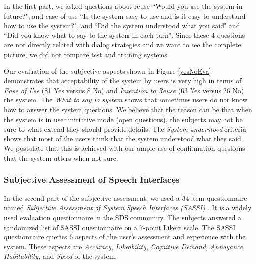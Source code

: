 \begin{sloppy}
In the first part, we asked questions about reuse ``Would you use the system in future?", and ease of use ``Is the system easy to use and is it easy to understand how to use the system?", and ``Did the system understood what you said" and ``Did you know what to say to the system in each turn". Since these 4 questions are not directly related with dialog strategies and we want to see the complete picture, we did not compare test and training systems. 

Our evaluation of the subjective aspects shown in Figure \ref{yesNoEva} demonstrates that acceptability of the system by users is very high in terms of {\em Ease of Use} (81 Yes versus 8 No) and {\em Intention to Reuse} (63 Yes versus 26 No)
the system. The {\em What to say to system} shows that sometimes users do not know how to answer the system questions. We believe that the reason can be that when the system is in user initiative mode (open questions), the subjects may not be sure to what extend they should provide details. 
The {\em System understood} criteria shows that most of the users think that the system understood what they said.  We postulate that this is achieved with our ample use of confirmation questions that the system utters when not sure.

\subsubsection{Subjective Assessment of Speech Interfaces}

In the second part of the subjective assessment, we used a 34-item questionnaire named {\em Subjective Assessment of System Speech Interfaces (SASSI)} \cite{SASSI}. It is a widely used evaluation questionnaire in the SDS community. The subjects answered a randomized list of SASSI questionnaire on a 7-point Likert scale. The SASSI questionnaire queries 6 aspects of the user's assessment and experience with the system.  These aspects are \textit{Accuracy}, \textit{Likeability}, \textit{Cognitive Demand}, \textit{Annoyance}, \textit{Habitability}, and \textit{Speed} of the system. 



\end{sloppy}
